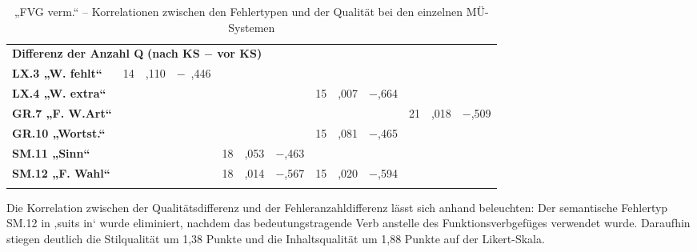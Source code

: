 \begin{sidewaystable}
\begin{tabularx}{\textwidth}{Xrrrrrrrrrrrr}
\midrule
\multicolumn{13}{l}{\textbf{Differenz der Anzahl Q} \textbf{(nach KS $-$ vor KS)}}\\
\textbf{LX.3 „W. fehlt“} & { 14} & \cellcolor{lsLightGray} {,110} & {$-$~,446} &   &  &  &  &  &  &  &  & \\
\textbf{LX.4 „W. extra“} &  &  &  &  &  &  & 15 & ,007 & \cellcolor{smBlue} {$-$,664} &  &  & \\
\textbf{GR.7 „F. W.Art“} &  &  &  &   &  &  &  &  &  & 21 & ,018 & \cellcolor{smBlue} {$-$,509}\\
\textbf{GR.10 „Wortst.“} &  &  &  &  &  &  & 15 & \cellcolor{lsLightGray} {,081} & $-$,465 &  &  & \\
\textbf{SM.11 „Sinn“} &  &  &  &  18 & \cellcolor{lsLightGray} {,053} & $-$,463 &  &  &  &  &  & \\
\textbf{SM.12 „F. Wahl“} & & &  &  18 & ,014 & \cellcolor{smBlue} {$-$,567} & 15 & ,020 & \cellcolor{lsLightGray} {$-$,594} &  &  & \\
\lspbottomrule
\end{tabularx}
\caption{\label{tab:05:36}„FVG verm.“ -- Korrelationen zwischen den Fehlertypen und der Qualität bei den einzelnen MÜ-Systemen}
\end{sidewaystable}

Die Korrelation zwischen der Qualitätsdifferenz und der Fehleranzahldifferenz lässt sich anhand  beleuchten: Der semantische Fehlertyp SM.12 in ‚suits in‘ wurde eliminiert, nachdem das bedeutungstragende Verb anstelle des Funktionsverbgefüges verwendet wurde. Daraufhin stiegen deutlich die Stilqualität um 1,38 Punkte und die Inhaltsqualität um 1,88 Punkte auf der Likert-Skala.


